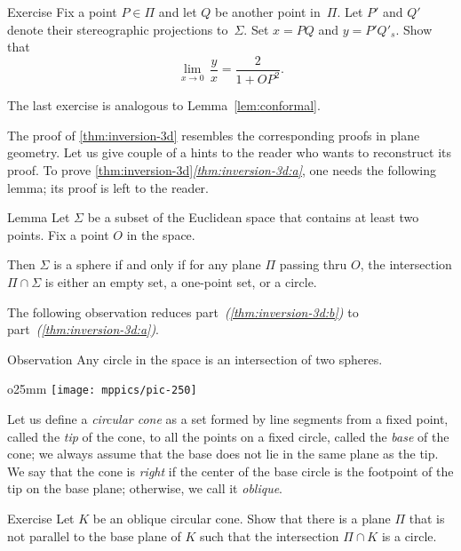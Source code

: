 \begin{thm}{Exercise}\label{ex:conform-sphere}
Fix a point $P\in \Pi$  and let $Q$ be another point in~$\Pi$.
Let $P'$ and $Q'$ denote their stereographic projections to~$\Sigma$.
Set $x=PQ$ and $y=P'Q'_s$.
Show that
$$\lim_{x\to 0}\, \frac{y}{x}=\frac{2}{1+OP^2}.$$
\end{thm}

The last exercise is analogous to Lemma~\ref{lem:conformal}.

The proof of \ref{thm:inversion-3d} resembles the corresponding proofs in plane geometry.
Let us give couple of a hints to the reader who wants to reconstruct its proof.
To prove \ref{thm:inversion-3d}\textit{\ref{thm:inversion-3d:a}}, one needs the following lemma;
its proof is left to the reader.

\begin{thm}{Lemma}
Let $\Sigma$ be a subset of the Euclidean space
that contains at least two points.
Fix a point $O$ in the space.

Then $\Sigma$ is 
a sphere 
if and only if
for any plane $\Pi$ passing thru $O$,
the intersection $\Pi\cap \Sigma$ is either an empty set,
a one-point set, or a circle.
\end{thm}  

The following observation reduces part~\textit{(\ref{thm:inversion-3d:b})} to part~\textit{(\ref{thm:inversion-3d:a})}.

\begin{thm}{Observation}
Any circle in the space is an intersection of two spheres.
\end{thm}

{

\begin{wrapfigure}{o}{25mm}
\centering
\texttt{[image: mppics/pic-250]}
\end{wrapfigure}

Let us define a \emph{circular cone} as a set formed by line segments from a fixed point, called the \emph{tip} of the cone, to all the points on a fixed circle, called the \emph{base} of the cone;
we always assume that the base does not lie in the same plane as the tip.
We say that the cone is \emph{right}
if the center of the base circle is the footpoint of the tip on the base plane;
otherwise, we call it \emph{oblique}.

}

\begin{thm}{Exercise}\label{ex:cone}
Let $K$ be an oblique circular cone.
Show that there is a plane $\Pi$ that is not parallel to the base plane of $K$ such that the intersection $\Pi\cap K$ is a circle.
\end{thm}

